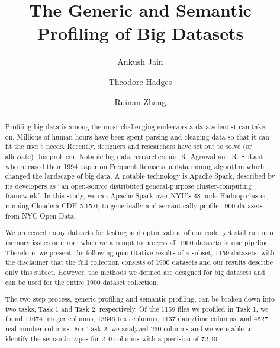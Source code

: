 \documentclass[sigconf,authordraft]{acmart}
\begin{document}
\title{The Generic and Semantic Profiling of Big Datasets}





\author{Ankush Jain}

\author{Theodore Hadges}

\author{Ruinan Zhang}


\renewcommand{\shortauthors}{Jain, Hadges, and Zhang, et al.}

\begin{abstract}
Profiling big data is among the most challenging endeavors a data scientist can take on. Millions of human hours have been spent parsing and cleaning data so that it can fit the user’s needs. Recently, designers and researchers have set out to solve (or alleviate) this problem. Notable big data researchers are R. Agrawal and R. Srikant who released their 1994 paper on Frequent Itemsets, a data mining algorithm which changed the landscape of big data. A notable technology is Apache Spark, described by its developers as “an open-source distributed general-purpose cluster-computing framework”. In this study, we ran Apache Spark over NYU’s 48-node Hadoop cluster, running Cloudera CDH 5.15.0, to generically and semantically profile 1900 datasets from NYC Open Data.

We processed many datasets for testing and optimization of our code, yet still run into memory issues or errors when we attempt to process all 1900 datasets in one pipeline. Therefore, we present the following quantitative results of a subset, 1159 datasets, with the disclaimer that the full collection consists of 1900 datasets and our results describe only this subset. However, the methods we defined are designed for big datasets and can be used for the entire 1900 dataset collection.

The two-step process, generic profiling and semantic profiling, can be broken down into two tasks, Task 1 and Task 2, respectively. Of the 1159 files we profiled in Task 1, we found 11674 integer columns, 13646 text columns, 1137 date/time columns, and 4527 real number columns. For Task 2, we
analyzed 260 columns and we were able to identify the semantic types for 210 columns with a precision of 72.40%

\end{abstract}
\end{document}
